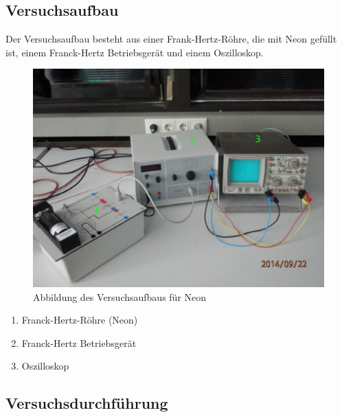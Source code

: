 \documentclass[12pt,a4paper]{article}
\begin{document}
\subsection{Versuchsaufbau}

Der Versuchsaufbau besteht aus einer Frank-Hertz-Röhre, die mit Neon gefüllt ist, einem Franck-Hertz Betriebsgerät und einem Oszilloskop.

\begin{figure}[H] 
  \centering
    \includegraphics[scale = 0.3]{aufbau_n.pdf}
  	\caption[Abbildung des Versuchsaufbaus für Neon]{Abbildung des Versuchsaufbaus für Neon}
  \label{fig:abb_versuch_3}
\end{figure}

\begin{enumerate}
\item	Franck-Hertz-Röhre (Neon)

\item	Franck-Hertz Betriebsgerät

\item	Oszilloskop
\end{enumerate}

\subsection{Versuchsdurchführung}
\end{document}

